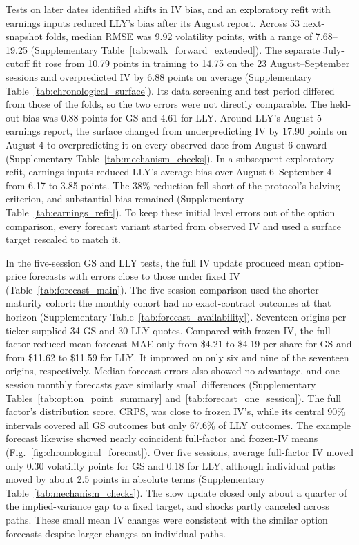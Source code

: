 Tests on later dates identified shifts in IV bias, and an exploratory refit with earnings inputs reduced LLY's bias after its August report. Across 53 next-snapshot folds, median RMSE was 9.92 volatility points, with a range of 7.68--19.25 (Supplementary Table~\ref{tab:walk_forward_extended}). The separate July-cutoff fit rose from 10.79 points in training to 14.75 on the 23 August--September sessions and overpredicted IV by 6.88 points on average (Supplementary Table~\ref{tab:chronological_surface}). Its data screening and test period differed from those of the folds, so the two errors were not directly comparable. The held-out bias was 0.88 points for GS and 4.61 for LLY. Around LLY's August 5 earnings report, the surface changed from underpredicting IV by 17.90 points on August 4 to overpredicting it on every observed date from August 6 onward (Supplementary Table~\ref{tab:mechanism_checks}). In a subsequent exploratory refit, earnings inputs reduced LLY's average bias over August 6--September 4 from 6.17 to 3.85 points. The 38\% reduction fell short of the protocol's halving criterion, and substantial bias remained (Supplementary Table~\ref{tab:earnings_refit}). To keep these initial level errors out of the option comparison, every forecast variant started from observed IV and used a surface target rescaled to match it.

In the five-session GS and LLY tests, the full IV update produced mean option-price forecasts with errors close to those under fixed IV (Table~\ref{tab:forecast_main}). The five-session comparison used the shorter-maturity cohort: the monthly cohort had no exact-contract outcomes at that horizon (Supplementary Table~\ref{tab:forecast_availability}). Seventeen origins per ticker supplied 34 GS and 30 LLY quotes. Compared with frozen IV, the full factor reduced mean-forecast MAE only from \$4.21 to \$4.19 per share for GS and from \$11.62 to \$11.59 for LLY. It improved on only six and nine of the seventeen origins, respectively. Median-forecast errors also showed no advantage, and one-session monthly forecasts gave similarly small differences (Supplementary Tables~\ref{tab:option_point_summary} and~\ref{tab:forecast_one_session}). The full factor's distribution score, CRPS, was close to frozen IV's, while its central 90\% intervals covered all GS outcomes but only 67.6\% of LLY outcomes. The example forecast likewise showed nearly coincident full-factor and frozen-IV means (Fig.~\ref{fig:chronological_forecast}). Over five sessions, average full-factor IV moved only 0.30 volatility points for GS and 0.18 for LLY, although individual paths moved by about 2.5 points in absolute terms (Supplementary Table~\ref{tab:mechanism_checks}). The slow update closed only about a quarter of the implied-variance gap to a fixed target, and shocks partly canceled across paths. These small mean IV changes were consistent with the similar option forecasts despite larger changes on individual paths.

